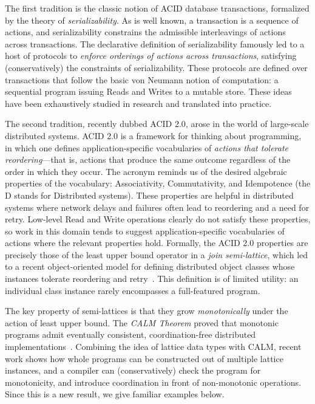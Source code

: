 \documentclass{sig-alternate}
\begin{document}
The first tradition is the classic notion of \textsf{ACID} database transactions, formalized by the theory of \emph{serializability}.  As is well known, a transaction is a sequence of actions, and serializability constrains the admissible interleavings of actions across transactions.  The declarative definition of serializability famously led to a host of protocols to \emph{enforce orderings of actions across transactions}, satisfying (conservatively) the constraints of serializability.  These protocols are defined over transactions that follow the basic von Neumann notion of computation: a sequential program issuing Reads and Writes to a mutable store.  These ideas have been exhaustively studied in research and translated into practice.

The second tradition, recently dubbed \textsf{ACID 2.0}, arose in the world of large-scale distributed systems.  ACID 2.0 is a framework for thinking about programming, in which one defines application-specific vocabularies of \emph{actions that tolerate reordering}---that is, 
actions that produce the same outcome regardless of the order in which they occur.
The acronym reminds us of the desired algebraic properties of the vocabulary: Associativity, Commutativity, and Idempotence (the D stands for Distributed systems).  These properties are helpful in distributed systems where network delays and failures often lead to reordering and a need for retry. Low-level Read and Write operations clearly do not satisfy these properties, so work in this domain tends to suggest application-specific vocabularies of actions where the relevant properties hold.  Formally, the ACID 2.0 properties are precisely those of the least upper bound operator in a {\em join semi-lattice}, which led to a recent object-oriented model for defining distributed object classes whose instances tolerate reordering and retry~\cite{CRDTs}.  This definition is of limited utility: an individual class instance rarely encompasses a full-featured program.

The key property of semi-lattices is that they grow \emph{monotonically} under the action of least upper bound.  The \emph{CALM Theorem} proved that monotonic programs admit eventually consistent, coordination-free distributed implementations~\cite{calm}.  Combining the idea of lattice data types with CALM, recent work shows how whole programs can be constructed out of multiple lattice instances, and a compiler can (conservatively) check the program for monotonicity, and introduce coordination in front of non-monotonic operations.  Since this is a new result, we give familiar examples below.
\end{document}
